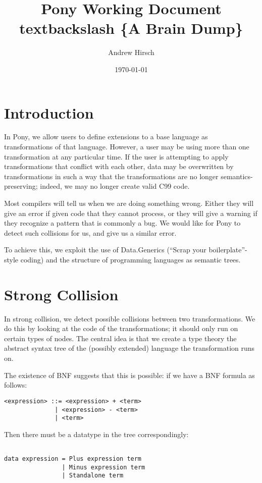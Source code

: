 \documentclass[11pt]{article}
\title{Pony Working Document\\textbackslash{} \{\small A Brain Dump\}}
\author{Andrew Hirsch}
\date{\today}
\begin{document}
\maketitle


\section{Introduction}
\label{sec-1}


In Pony, we allow users to define extensions to a base language as transformations of that language. However, a user may be using more than one transformation at any particular time. If the user is attempting to apply transformations that conflict with each other, data may be overwritten by transformations in such a way that the transformations are no longer semantics-preserving; indeed, we may no longer create valid C99 code.

Most compilers will tell us when we are doing something wrong. Either they will give an error if given code that they cannot process, or they will give a warning if they recognize a pattern that is commonly a bug. We would like for Pony to detect such collisions for us, and give us a similar error.

To achieve this, we exploit the use of Data.Generics (``Scrap your boilerplate''-style coding) and the structure of programming languages as semantic trees.
\section{Strong Collision}
\label{sec-2}


In strong collision, we detect possible collisions between two transformations. We do this by looking at the code of the transformations; it should only run on certain types of nodes. The central idea is that we create a type theory the abstract syntax tree of the (possibly extended) language the transformation runs on.

The existence of BNF suggests that this is possible: if we have a BNF formula as follows:

\begin{verbatim}
<expression> ::= <expression> + <term>
              | <expression> - <term>
              | <term>                
\end{verbatim}

Then there must be a datatype in the tree correspondingly:

\begin{lstlisting}

data expression = Plus expression term
                | Minus expression term 
                | Standalone term

\end{lstlisting}
\end{document}
